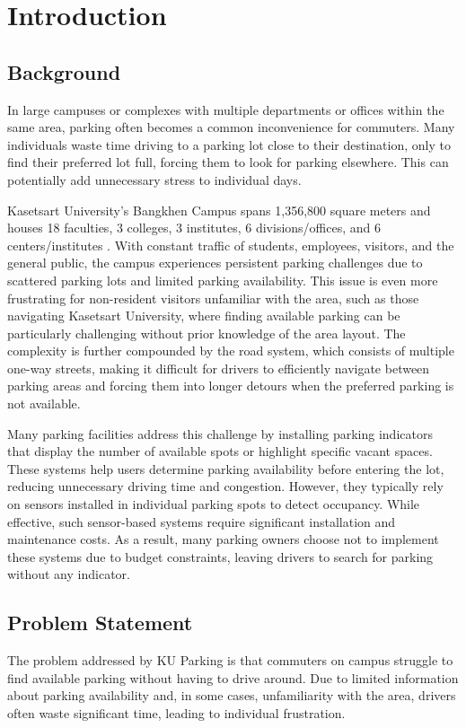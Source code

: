 \chapter{Introduction}
\label{chap:introduction}

\section{Background}
\label{section:background}

In large campuses or complexes with multiple departments or offices within the same area, parking often becomes a common inconvenience for commuters.
Many individuals waste time driving to a parking lot close to their destination, only to find their preferred lot full, forcing them to look for parking elsewhere. This can potentially add unnecessary stress to individual days.


Kasetsart University's Bangkhen Campus spans 1,356,800 square meters and houses 18 faculties, 3 colleges, 3 institutes, 6 divisions/offices, and 6 centers/institutes \cite{ku_campus_info}. With constant traffic of students, employees, visitors, and the general public, the campus experiences persistent parking challenges due to scattered parking lots and limited parking availability. This issue is even more frustrating for non-resident visitors unfamiliar with the area, such as those navigating Kasetsart University, where finding available parking can be particularly challenging without prior knowledge of the area layout. The complexity is further compounded by the road system, which consists of multiple one-way streets, making it difficult for drivers to efficiently navigate between parking areas and forcing them into longer detours when the preferred parking is not available.


Many parking facilities address this challenge by installing parking indicators that display the number of available spots or highlight specific vacant spaces.
These systems help users determine parking availability before entering the lot, reducing unnecessary driving time and congestion. However, they typically rely on sensors installed in individual parking spots to detect occupancy.
While effective, such sensor-based systems require significant installation and maintenance costs.
As a result, many parking owners choose not to implement these systems due to budget constraints, leaving drivers to search for parking without any indicator.

\section{Problem Statement}
\label{section:problem-statement}
The problem addressed by KU Parking is that commuters on campus struggle to find available parking without having to drive around. Due to limited information about parking availability and, in some cases, unfamiliarity with the area, drivers often waste significant time, leading to individual frustration. 

